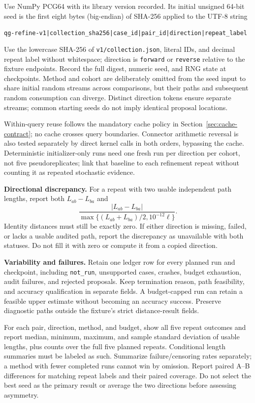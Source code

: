 \documentclass[11pt,letterpaper]{article}
\newcommand{\src}[1]{\nolinkurl{#1}}
\begin{document}
Use NumPy PCG64 with its library version recorded. Its initial unsigned 64-bit seed is the first eight bytes (big-endian) of SHA-256 applied to the UTF-8 string
\begin{center}\small
\src{qg-refine-v1|collection_sha256|case_id|pair_id|direction|repeat_label}
\end{center}
Use the lowercase SHA-256 of \src{v1/collection.json}, literal IDs, and decimal repeat label without whitespace; direction is \src{forward} or \src{reverse} relative to the fixture endpoints. Record the full digest, numeric seed, and RNG state at checkpoints. Method and cohort are deliberately omitted from the seed input to share initial random streams across comparisons, but their paths and subsequent random consumption can diverge. Distinct direction tokens ensure separate streams; common starting seeds do not imply identical proposal locations.

Within-query reuse follows the mandatory cache policy in Section~\ref{sec:cache-contract}; no cache crosses query boundaries. Connector arithmetic reversal is also tested separately by direct kernel calls in both orders, bypassing the cache. Deterministic initializer-only runs need one fresh run per direction per cohort, not five pseudoreplicates; link that baseline to each refinement repeat without counting it as repeated stochastic evidence.

\textbf{Directional discrepancy.} For a repeat with two usable independent path lengths, report both $L_{ab}-L_{ba}$ and
\[
 \frac{|L_{ab}-L_{ba}|}{\max\{(L_{ab}+L_{ba})/2,10^{-12}\ell\}}.
\]
Identity distances must still be exactly zero. If either direction is missing, failed, or lacks a usable audited path, report the discrepancy as unavailable with both statuses. Do not fill it with zero or compute it from a copied direction.

\textbf{Variability and failures.} Retain one ledger row for every planned run and checkpoint, including \src{not_run}, unsupported cases, crashes, budget exhaustion, audit failures, and rejected proposals. Keep termination reason, path feasibility, and accuracy qualification in separate fields. A budget-capped run can retain a feasible upper estimate without becoming an accuracy success. Preserve diagnostic paths outside the fixture's strict distance-result fields.

For each pair, direction, method, and budget, show all five repeat outcomes and report median, minimum, maximum, and sample standard deviation of usable lengths, plus counts over the full five planned repeats. Conditional length summaries must be labeled as such. Summarize failure/censoring rates separately; a method with fewer completed runs cannot win by omission. Report paired A--B differences for matching repeat labels and their paired coverage. Do not select the best seed as the primary result or average the two directions before assessing asymmetry.
\end{document}
